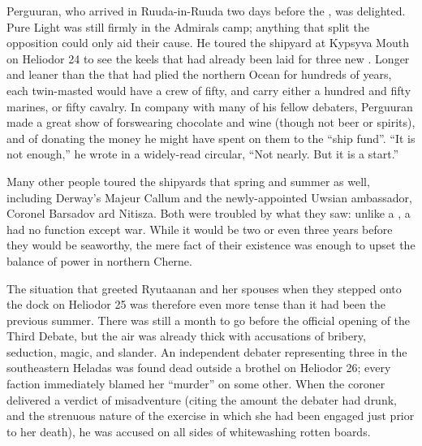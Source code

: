 \documentclass[12pt]{report}
\begin{document}
Perguuran, who arrived in Ruuda-in-Ruuda two days before the
, was delighted.  Pure Light was still firmly in the
Admirals camp; anything that split the opposition could only aid their
cause.  He toured the shipyard at Kypsyva Mouth on Heliodor 24 to see
the keels that had already been laid for three new .
Longer and leaner than the  that had plied the northern
Ocean for hundreds of years, each twin-masted  would
have a crew of fifty, and carry either a hundred and fifty marines, or
fifty cavalry.  In company with many of his fellow debaters, Perguuran
made a great show of forswearing chocolate and wine (though not beer
or spirits), and of donating the money he might have spent on them to
the ``ship fund''.  ``It is not enough,'' he wrote in a widely-read
circular, ``Not nearly.  But it is a start.''

Many other people toured the shipyards that spring and summer as well,
including Derway's Majeur Callum and the newly-appointed Uwsian
ambassador, Coronel Barsadov ard Nitisza.  Both were troubled by what
they saw: unlike a , a  had no function
except war.  While it would be two or even three years before they
would be seaworthy, the mere fact of their existence was enough to
upset the balance of power in northern Cherne.

The situation that greeted Ryutaanan and her spouses when they stepped
onto the dock on Heliodor 25 was therefore even more tense than it had
been the previous summer.  There was still a month to go before the
official opening of the Third Debate, but the air was already thick
with accusations of bribery, seduction, magic, and slander.  An
independent debater representing three  in the
southeastern Heladas was found dead outside a brothel on Heliodor 26;
every faction immediately blamed her ``murder'' on some other.  When the
coroner delivered a verdict of misadventure (citing the amount the
debater had drunk, and the strenuous nature of the exercise in which
she had been engaged just prior to her death), he was accused on all
sides of whitewashing rotten boards.
\end{document}
